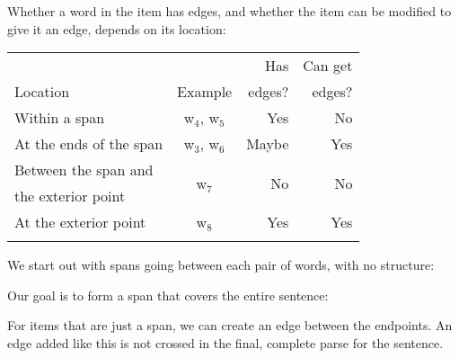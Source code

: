 \noindent
\parbox[c]{2.3in}{
Whether a word in the item has edges, and whether the item can be modified to give it an edge, depends on its location: \\
}\hfill\begin{tabular}{lcrr}
  \hline
   & & Has & Can get \\
  Location & Example & edges? & edges? \\
  \hline
  \hline
  Within a span & w$_4$, w$_5$ & Yes & No \\
  At the ends of the span & w$_3$, w$_6$ & Maybe & Yes \\
  Between the span and & \multirow{2}{*}{w$_7$} & \multirow{2}{*}{No} & \multirow{2}{*}{No} \\
  the exterior point & & & \\
  At the exterior point & w$_8$ & Yes & Yes \\
  \hline \\
\end{tabular}

\noindent
\parbox{4in}{
We start out with spans going between each pair of words, with no structure: \\
}\hfill{}\hfill\strut

\noindent
\parbox{2.5in}{
Our goal is to form a span that covers the entire sentence: \\
}\hfill{}

\noindent
\parbox{4in}{
For items that are just a span, we can create an edge between the endpoints.
An edge added like this is not crossed in the final, complete parse for the sentence. \\
}\hfill{}\hfill\strut

